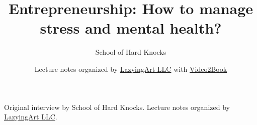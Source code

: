 \documentclass[11pt,oneside]{book}
\begin{document}
\frontmatter
\title{Entrepreneurship: How to manage stress and mental health?}
\author{School of Hard Knocks}
\date{Lecture notes organized by \href{https://lazying.art}{LazyingArt LLC} with \href{https://github.com/lachlanchen/Video2Book}{Video2Book}}
\maketitle
\begin{center}
\small Original interview by School of Hard Knocks. Lecture notes organized by \href{https://lazying.art}{LazyingArt LLC}.
\end{center}
\clearpage
\mainmatter

\end{document}
